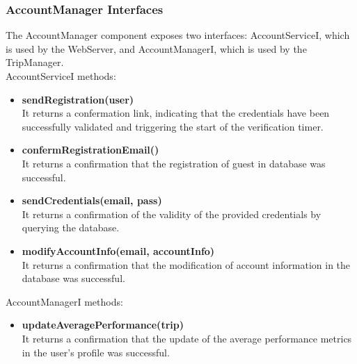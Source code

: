 \subsubsection{AccountManager Interfaces}
The AccountManager component exposes two interfaces: AccountServiceI, which is used by the WebServer, and AccountManagerI, which is used by the TripManager.\\
AccountServiceI methods:
\begin{itemize}
    \item \textbf{sendRegistration(user)}\\
    It returns a confermation link, indicating that the credentials have been successfully validated and triggering the start of the verification timer.
    \item \textbf{confermRegistrationEmail()}\\
    It returns a confirmation that the registration of guest in database was successful.
    \item \textbf{sendCredentials(email, pass)}\\
    It returns a confirmation of the validity of the provided credentials by querying the database.
    \item \textbf{modifyAccountInfo(email, accountInfo)}\\
    It returns a confirmation that the modification of account information in the database was successful.
\end{itemize}
AccountManagerI methods:
\begin{itemize}
    \item \textbf{updateAveragePerformance(trip)}\\
    It returns a confirmation that the update of the average performance metrics in the user's profile was successful.
\end{itemize}

